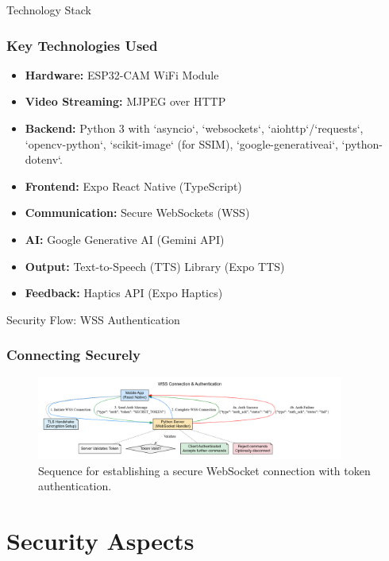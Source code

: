 \documentclass{beamer}
\begin{document}
\begin{frame}{Technology Stack}
    \frametitle{Key Technologies Used}
    \begin{itemize}
        \item \textbf{Hardware:} ESP32-CAM WiFi Module
        \item \textbf{Video Streaming:} MJPEG over HTTP
        \item \textbf{Backend:} Python 3 with `asyncio`, `websockets`, `aiohttp`/`requests`, `opencv-python`, `scikit-image` (for SSIM), `google-generativeai`, `python-dotenv`.
        \item \textbf{Frontend:} Expo React Native (TypeScript)
        \item \textbf{Communication:} Secure WebSockets (WSS)
        \item \textbf{AI:} Google Generative AI (Gemini API)
        \item \textbf{Output:} Text-to-Speech (TTS) Library (Expo TTS)
        \item \textbf{Feedback:} Haptics API (Expo Haptics)
    \end{itemize}
\end{frame}

\begin{frame}{Security Flow: WSS Authentication}
  \frametitle{Connecting Securely}
   \begin{figure}
      \centering
      \includegraphics[width=0.9\textwidth, height=0.7\textheight, keepaspectratio]{Security_Flow_Diagram.png}
      \caption{Sequence for establishing a secure WebSocket connection with token authentication.}
  \end{figure}
\end{frame}

\section{Security Aspects}
\end{document}
